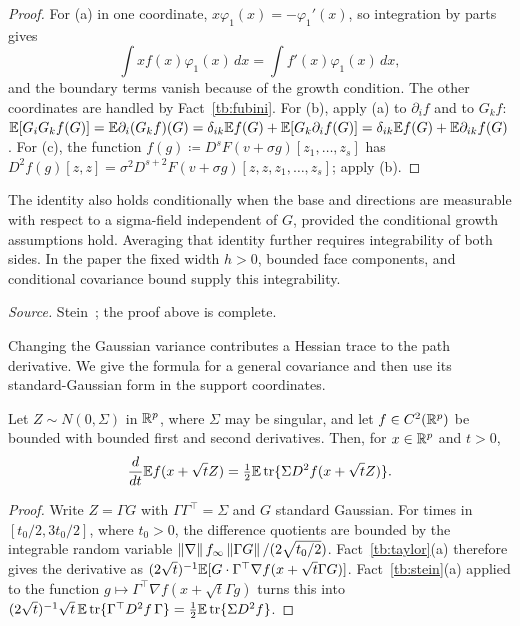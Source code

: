 \begin{proof}
For (a) in one coordinate, \(x\varphi_1(x)=-\varphi_1'(x)\), so integration by
parts gives
\[\int xf(x)\varphi_1(x)\,dx=\int f'(x)\varphi_1(x)\,dx,\]
and the boundary terms vanish because of the growth condition. The other coordinates
are handled by Fact~\ref{tb:fubini}. For (b), apply (a) to \(\partial_if\) and
to \(G_kf\): \(\mathbb E[G_iG_kf(G)]=\mathbb E\partial_i(G_kf)(G)=\delta_{ik}\mathbb E f(G)
+\mathbb E[G_k\partial_if(G)]=\delta_{ik}\mathbb E f(G)+\mathbb E\partial_{ik}f(G)\). For (c), the
function \(f(g)\coloneqq D^sF(v+\sigma g)[z_1,\ldots,z_s]\) has
\(D^2f(g)[z,z]=\sigma^2D^{s+2}F(v+\sigma g)[z,z,z_1,\ldots,z_s]\); apply (b).
\end{proof}

The identity also holds conditionally when the base and directions are
measurable with respect to a sigma-field independent of \(G\), provided
the conditional growth assumptions hold. Averaging that identity further
requires integrability of both sides. In the paper the fixed width
\(h>0\), bounded face components, and conditional covariance bound
supply this integrability.

\emph{Source.} Stein~; the proof above is complete.

Changing the Gaussian variance contributes a Hessian trace to the path
derivative. We give the formula for a general covariance and then use
its standard-Gaussian form in the support coordinates.

\begin{fact}\label{tb:heat}
Let \(Z\sim N(0,\Sigma)\) in \(\mathbb R^p\), where \(\Sigma\) may be singular, and
let \(f\in C^2(\mathbb R^p)\) be bounded with bounded first and second derivatives.
Then, for \(x\in\mathbb R^p\) and \(t>0\),
\[
 \frac d{dt}\mathbb E f(x+\sqrt t Z)
 =\tfrac12\mathbb E\operatorname{tr}\{\Sigma D^2f(x+\sqrt t Z)\}.
\]
\end{fact}

\begin{proof}
Write \(Z=\Gamma G\) with \(\Gamma\Gamma^\top=\Sigma\) and \(G\) standard
Gaussian. For times in \([t_0/2,3t_0/2]\), where \(t_0>0\), the difference
quotients are bounded by the integrable random variable
\(\left\lVert\nabla\right\rVert f_\infty\left\lVert\Gamma G\right\rVert/(2\sqrt{t_0/2})\).
Fact~\ref{tb:taylor}(a) therefore gives the derivative as
\((2\sqrt t)^{-1}\mathbb E[G\cdot\Gamma^\top\nabla f(x+\sqrt t\Gamma G)]\).
Fact~\ref{tb:stein}(a) applied to the function \(g\mapsto
\Gamma^\top\nabla f(x+\sqrt t\Gamma g)\) turns this into
\((2\sqrt t)^{-1}\sqrt t\,\mathbb E\operatorname{tr}\{\Gamma^\top D^2f\,\Gamma\}
=\frac12\mathbb E\operatorname{tr}\{\Sigma D^2f\}\).
\end{proof}

